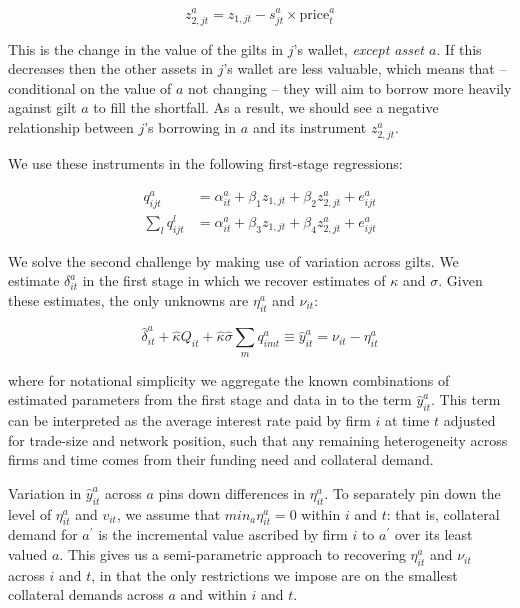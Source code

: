 \begin{equation}\label{eq:secondInstrument}
z^a_{2,jt}= z_{1,jt}-s_{jt}^a\times\text{price}^a_{t}
\end{equation}

This is the change in the value of the gilts in $j$'s wallet, \textit{except asset $a$}. If this decreases then the other assets in $j$'s wallet are less valuable, which means that -- conditional on the value of $a$ not changing -- they will aim to borrow more heavily against gilt $a$ to fill the shortfall. As a result, we should see a negative relationship between $j$'s borrowing in $a$ and its instrument $z^a_{2,jt}$.

We use these instruments in the following first-stage regressions:

\vspace{-8pt}

\begin{align*}
    q^a_{ijt}&=\alpha^a_{it}+\beta_1 z_{1,jt}+\beta_2 z^a_{2,jt}+e^a_{ijt}\\
    \sum_l q^l_{ijt}&=\alpha^a_{it}+\beta_3 z_{1,jt}+\beta_4 z^a_{2,jt}+e^a_{ijt}
\end{align*}


We solve the second challenge by making use of variation across gilts. We estimate $\delta^a_{it}$ in the first stage in which we recover estimates of $\kappa$ and $\sigma$. Given these estimates, the only unknowns are $\eta^a_{it}$ and $\nu_{it}$:

\begin{equation}
    \hat{\delta}^a_{it}+\hat{\kappa} Q_{it}+\hat{\kappa} \hat{\sigma}\sum_m q^a_{imt} \equiv \hat{y}^a_{it}=\nu_{it}-\eta^a_{it}
\end{equation}

\noindent where for notational simplicity we aggregate the known combinations of estimated parameters from the first stage and data in to the term $\hat{y}^a_{it}$. This term can be interpreted as the average interest rate paid by firm $i$ at time $t$ adjusted for trade-size and network position, such that any remaining heterogeneity across firms and time comes from their funding need and collateral demand.

Variation in $\hat{y}^a_{it}$ across $a$ pins down differences in $\eta^a_{it}$. To separately pin down the level of $\eta^a_{it}$ and $v_{it}$, we assume that $min_a \eta^a_{it}=0$ within $i$ and $t$: that is, collateral demand for $a^{'}$ is the incremental value ascribed by firm $i$ to $a^{'}$ over its least valued $a$. This gives us a semi-parametric approach to recovering $\eta^a_{it}$ and $\nu_{it}$ across $i$ and $t$, in that the only restrictions we impose are on the smallest collateral demands across $a$ and within $i$ and $t$.

